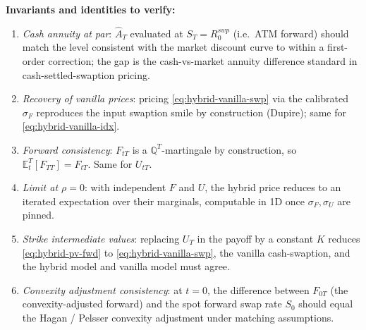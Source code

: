\documentclass[11pt,a4paper]{article}
\begin{document}
\begin{validation}
\textbf{Invariants and identities to verify:}
\begin{enumerate}[noitemsep]
  \item \emph{Cash annuity at par}: $\widehat A_T$ evaluated at
        $S_T = R^{swp}_0$ (i.e.\ ATM forward) should match the level
        consistent with the market discount curve to within a
        first-order correction; the gap is the cash-vs-market annuity
        difference standard in cash-settled-swaption pricing.
  \item \emph{Recovery of vanilla prices}: pricing
        \eqref{eq:hybrid-vanilla-swp} via the calibrated $\sigma_F$
        reproduces the input swaption smile by construction
        (Dupire); same for \eqref{eq:hybrid-vanilla-idx}.
  \item \emph{Forward consistency}: $F_{tT}$ is a $\mathbb{Q}^T$-martingale
        by construction, so $\mathbb{E}^T_t[F_{TT}] = F_{tT}$. Same
        for $U_{tT}$.
  \item \emph{Limit at $\rho = 0$}: with independent $F$ and $U$,
        the hybrid price reduces to an iterated expectation over
        their marginals, computable in 1D once $\sigma_F, \sigma_U$
        are pinned.
  \item \emph{Strike intermediate values}: replacing $U_T$ in the
        payoff by a constant $K$ reduces \eqref{eq:hybrid-pv-fwd} to
        \eqref{eq:hybrid-vanilla-swp}, the vanilla cash-swaption,
        and the hybrid model and vanilla model must agree.
  \item \emph{Convexity adjustment consistency}: at $t = 0$, the
        difference between $F_{0T}$ (the convexity-adjusted forward)
        and the spot forward swap rate $S_0$ should equal the
        Hagan / Pelsser convexity adjustment under matching
        assumptions.
\end{enumerate}
\end{validation}

\end{document}
